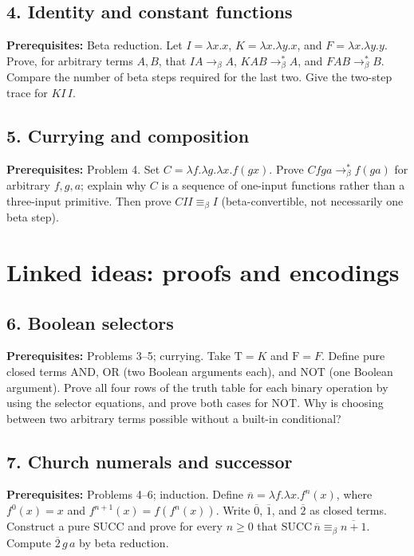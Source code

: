 \documentclass[12pt]{article}
\begin{document}
\subsection*{4. Identity and constant functions}
\textbf{Prerequisites:} Beta reduction.
Let $I=\lambda x.x$, $K=\lambda x.\lambda y.x$, and $F=\lambda x.\lambda y.y$. Prove, for arbitrary terms $A,B$, that $IA\to_\beta A$, $KAB\to_\beta^* A$, and $FAB\to_\beta^* B$. Compare the number of beta steps required for the last two. Give the two-step trace for $KI\,I$.

\subsection*{5. Currying and composition}
\textbf{Prerequisites:} Problem 4.
Set $C=\lambda f.\lambda g.\lambda x.f(gx)$. Prove $Cfga\to_\beta^* f(ga)$ for arbitrary $f,g,a$; explain why $C$ is a sequence of one-input functions rather than a three-input primitive. Then prove $CII\equiv_\beta I$ (beta-convertible, not necessarily one beta step).

\section{Linked ideas: proofs and encodings}

\subsection*{6. Boolean selectors}
\textbf{Prerequisites:} Problems 3--5; currying.
Take $\mathrm{T}=K$ and $\mathrm{F}=F$. Define pure closed terms $\mathrm{AND}$, $\mathrm{OR}$ (two Boolean arguments each), and $\mathrm{NOT}$ (one Boolean argument). Prove all four rows of the truth table for each binary operation by using the selector equations, and prove both cases for $\mathrm{NOT}$. Why is choosing between two arbitrary terms possible without a built-in conditional?

\subsection*{7. Church numerals and successor}
\textbf{Prerequisites:} Problems 4--6; induction.
Define $\overline n=\lambda f.\lambda x.f^n(x)$, where $f^0(x)=x$ and $f^{n+1}(x)=f(f^n(x))$. Write $\overline0$, $\overline1$, and $\overline2$ as closed terms. Construct a pure $\mathrm{SUCC}$ and prove for every $n\ge0$ that $\mathrm{SUCC}\,\overline n\equiv_\beta\overline{n+1}$. Compute $\overline2\,g\,a$ by beta reduction.
\end{document}
